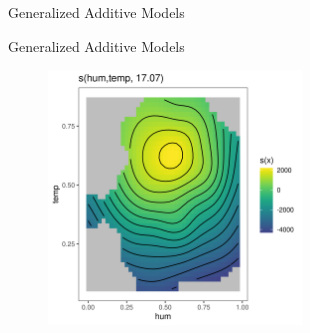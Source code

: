 \documentclass[11pt,compress,t,notes=noshow, xcolor=table]{beamer}
\begin{document}
\begin{vbframe}{Generalized Additive Models}
\tiny

\end{vbframe}


\begin{vbframe}{Generalized Additive Models}
\begin{figure}
  \includegraphics[width = 0.6\textwidth]{figure/gam_effect_plot.png}
\end{figure}
\end{vbframe}
\end{document}
